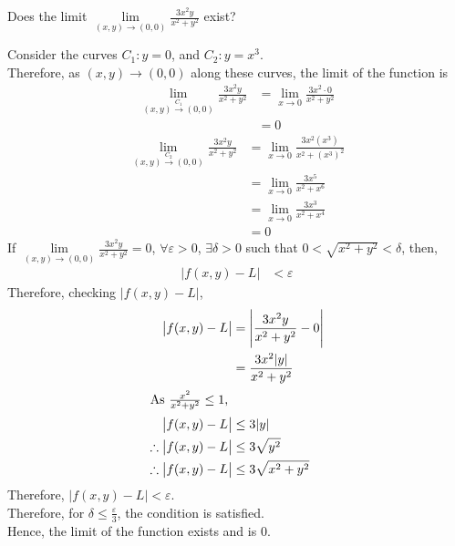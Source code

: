 \documentclass[fleqn, a4paper, 8pt, twoside]{amsart}
\theoremstyle{definition}
\theoremstyle{bluedefinition}
\theoremstyle{redtheorem}
\begin{document}
\begin{multicols}{2}
\begin{spacing}{0.7}
\begin{question}
	Does the limit $\lim\limits_{(x,y) \to (0,0)} \frac{3 x^2 y}{x^2 + y^2}$ exist?
\end{question}

\begin{solution}
	Consider the curves $C_1 : y = 0$, and $C_2 : y = x^3$.\\
	Therefore, as $(x,y) \to (0,0)$ along these curves, the limit of the function is
	\begin{align*}
		\lim\limits_{(x,y) \xrightarrow{C_1} (0,0)} \frac{3 x^2 y}{x^2 + y^2} & = \lim\limits_{x \to 0} \frac{3 x^2 \cdot 0}{x^2 + y^2} \\
                                                                                      & = 0
	\end{align*}
	\begin{align*}
		\lim\limits_{(x,y) \xrightarrow{C_2} (0,0)} \frac{3 x^2 y}{x^2 + y^2} & = \lim\limits_{x \to 0} \frac{3 x^2 (x^3)}{x^2 + (x^3)^2} \\
                                                                                      & = \lim\limits_{x \to 0} \frac{3 x^5}{x^2 + x^6}           \\
                                                                                      & = \lim\limits_{x \to 0} \frac{3 x^3}{x^2 + x^4}           \\
                                                                                      & = 0
	\end{align*}
	If $\lim\limits_{(x,y) \to (0,0)} \frac{3 x^2 y}{x^2 + y^2} = 0$, $\forall \varepsilon > 0$, $\exists \delta > 0$ such that $0 < \sqrt{x^2 + y^2} < \delta$, then,
	\begin{align*}
		|f(x,y) - L| & < \varepsilon
	\end{align*}
	Therefore, checking $|f(x,y) - L|$,
	\begin{align*}
		\left| f(x,y) - L \right|            & = \left| \frac{3 x^2 y}{x^2 + y^2} - 0 \right| \\
                                                     & = \frac{3 x^2 |y|}{x^2 + y^2}                  \\
		\intertext{As $\frac{x^2}{x^2 + y^2} \le 1$,}
		\left| f(x,y) - L \right|            & \le 3 |y|                                      \\
		\therefore \left| f(x,y) - L \right| & \le 3 \sqrt{y^2}                               \\
		\therefore \left| f(x,y) - L \right| & \le 3 \sqrt{x^2 + y^2}
	\end{align*}
	Therefore, $|f(x,y) - L| < \varepsilon$.\\
	Therefore, for $\delta \le \frac{\varepsilon}{3}$, the condition is satisfied.\\
	Hence, the limit of the function exists and is $0$.
\end{solution}


\end{spacing}
\end{multicols}
\end{document}
